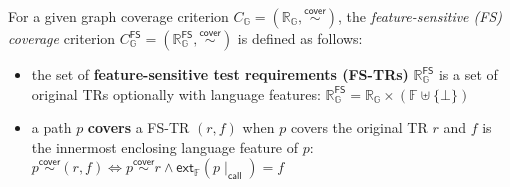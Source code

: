 \documentclass[acmsmall,review,screen]{acmart}
\newcommand{\name}[1]{\textsf{#1}}
\newcommand{\graph}{\mathbb{G}}
\newcommand{\pat}{p}
\newcommand{\cover}{\overset{\name{cover}}{\sim}}
\newcommand{\trset}[1]{\mathbb{R}_{#1}}
\newcommand{\tr}{r}
\newcommand{\cov}[1]{C_{#1}}
\newcommand{\featset}{\mathbb{F}}
\newcommand{\feat}{f}
\newcommand{\extfeat}{\name{ext}_\featset}
\newcommand{\css}[1]{{#1}\!\mid_{\name{call}}}
\newcommand{\fcov}[1]{\cov{#1}^{\name{FS}}}
\newcommand{\ftrset}[1]{\trset{#1}^{\name{FS}}}
\begin{document}
\begin{definition}\label{def:fs-cov}
  For a given graph coverage criterion $\cov{\graph} = (\trset{\graph},
  \cover)$, the \textit{feature-sensitive (FS) coverage} criterion
  $\fcov{\graph} = (\ftrset{\graph}, \cover)$ is defined as follows:
  \begin{itemize}
    \item the set of \textbf{feature-sensitive test requirements (FS-TRs)}
      $\ftrset{\graph}$ is a set of original TRs optionally with language features:
$
        \ftrset{\graph} = \trset{\graph} \times (\featset \uplus \{ \bot \})
$
    \item a path $\pat$ \textbf{covers} a FS-TR $(\tr, \feat)$ when $\pat$
      covers the original TR $\tr$ and $\feat$ is the innermost enclosing language feature
      of $\pat$:
$
        \pat \cover (\tr, \feat) \iff \pat \cover \tr \wedge
        \extfeat(\css{\pat}) = \feat
$
  \end{itemize}
\end{definition}

\end{document}
